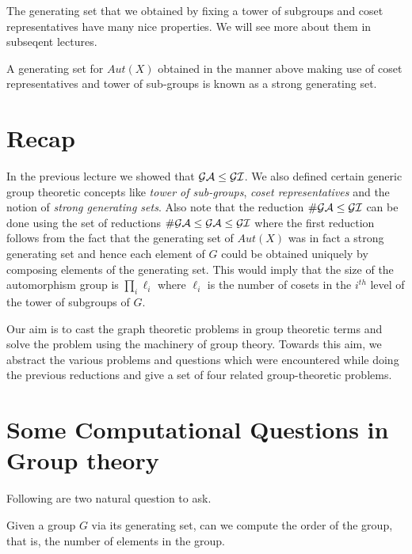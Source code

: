 The generating set that we obtained by fixing a tower of subgroups and coset
representatives have many nice properties. We will see more about them in
subseqent lectures.
\begin{definition}
	A generating set for $Aut(X)$ obtained in the manner above making use
	of coset representatives and tower of sub-groups is known as a strong
	generating set.  
\end{definition}




\section {Recap}
In the previous lecture we showed that $\cal{GA} \le \cal{GI}$. We also
defined certain generic group theoretic concepts like {\it tower of
sub-groups}, {\it coset representatives} and the notion of {\it strong
generating sets}.  Also note that the reduction $\cal{\#GA} \le \cal{GI}$ can
be done using the set of reductions ${\cal{\#GA} \le \cal{GA} \le \cal{GI}}$
where the first reduction follows from the fact that the generating set of
$Aut(X)$ was in fact a strong generating set and hence each element of $G$
could be obtained uniquely by composing elements of the generating set. 
This would imply that the size of the automorphism group is $\displaystyle
\prod_{i} \ell_{i}$ where $\ell_i$ is the number of cosets in the $i^{th}$
level of the tower of subgroups of $G$.

Our aim is to cast the graph theoretic problems in group theoretic terms and
solve the problem using the machinery of group theory.  Towards this aim, we
abstract the various problems and questions which were encountered while
doing the previous reductions and give a set of four related group-theoretic
problems.

\section{Some Computational Questions in Group theory}
Following are two natural question to ask.
\begin{problem}
	Given a group $G$ via its generating set, can we compute the order of
	the group, that is, the number of elements in the group.
\end{problem}



